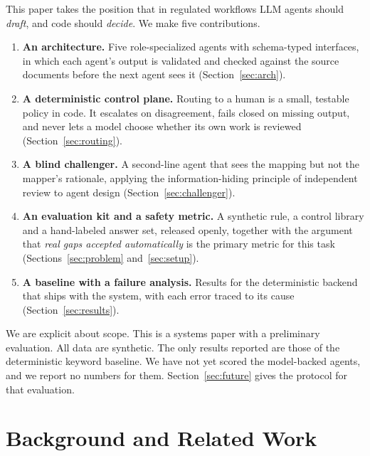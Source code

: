 \documentclass[sigconf,review,anonymous]{acmart}
\begin{document}
This paper takes the position that in regulated workflows LLM agents should
\emph{draft}, and code should \emph{decide}. We make five contributions.

\begin{enumerate}
  \item \textbf{An architecture.} Five role-specialized agents with
  schema-typed interfaces, in which each agent's output is validated and
  checked against the source documents before the next agent sees it
  (Section~\ref{sec:arch}).
  \item \textbf{A deterministic control plane.} Routing to a human is a
  small, testable policy in code. It escalates on disagreement, fails closed
  on missing output, and never lets a model choose whether its own work is
  reviewed (Section~\ref{sec:routing}).
  \item \textbf{A blind challenger.} A second-line agent that sees the
  mapping but not the mapper's rationale, applying the information-hiding
  principle of independent review to agent design
  (Section~\ref{sec:challenger}).
  \item \textbf{An evaluation kit and a safety metric.} A synthetic rule, a
  control library and a hand-labeled answer set, released openly, together
  with the argument that \emph{real gaps accepted automatically} is the
  primary metric for this task (Sections~\ref{sec:problem}
  and~\ref{sec:setup}).
  \item \textbf{A baseline with a failure analysis.} Results for the
  deterministic backend that ships with the system, with each error traced
  to its cause (Section~\ref{sec:results}).
\end{enumerate}

We are explicit about scope. This is a systems paper with a preliminary
evaluation. All data are synthetic. The only results reported are those of
the deterministic keyword baseline. We have not yet scored the model-backed
agents, and we report no numbers for them. Section~\ref{sec:future} gives the
protocol for that evaluation.

\section{Background and Related Work}
\label{sec:related}
\end{document}
